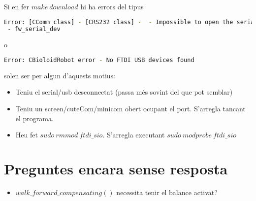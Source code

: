 \documentclass{article}
\begin{document}
Si en fer $make\ download$ hi ha errors del tipus
\begin{lstlisting}[language=bash]
Error: [CComm class] - [CRS232 class] -  - Impossible to open the serial port.
 - fw_serial_dev
\end{lstlisting} 
o
\begin{lstlisting}[language=bash]
Error: CBioloidRobot error - No FTDI USB devices found
\end{lstlisting} 
solen ser per algun d'aquests motius:
\begin{itemize}
	\item Teniu el serial/usb desconnectat (passa més sovint del que pot semblar)
	\item Teniu un screen/cuteCom/minicom obert ocupant el port. S'arregla tancant el programa.
	\item Heu fet $sudo\ rmmod\ ftdi\_sio$. S'arregla executant $sudo\ modprobe\ ftdi\_sio$
	\end{itemize}


\section{Preguntes encara sense resposta}
\begin{itemize}
	\item $walk\_forward\_compensating()$ necessita tenir el balance activat?
\end{itemize}
\end{document}
